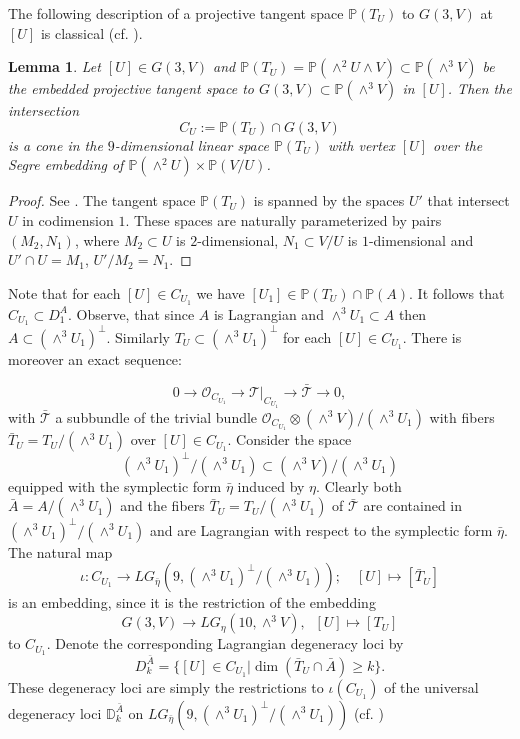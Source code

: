 \documentclass[a4paper,11pt]{amsart}
\newtheorem{lem}[thm]{Lemma}
\theoremstyle{definition}
\numberwithin{equation}{section}
\numberwithin{equation}{section} \theoremstyle{definition}
\begin{document}
The following description of a projective tangent space ${{\mathbb{P}}}(T_U)$ to $G(3,V)$ at $[U]$ is classical (cf. \cite{Donagi}).
\begin{lem}\label{lem-C_U} Let $[U]\in G(3,V)$ and ${{\mathbb{P}}}(T_{U})={{\mathbb{P}}}(\wedge^2{U}\wedge V)\subset {{\mathbb{P}}}(\wedge^3V)$ be the embedded projective tangent space to $G(3,V)\subset {{\mathbb{P}}}(\wedge^3 V)$ in $[U]$.
Then the intersection
$$C_{U}:={{\mathbb{P}}}(T_{U})\cap G(3,V)$$ 
 is a cone in the $9$-dimensional linear space ${{\mathbb{P}}}(T_{U})$ with vertex $[U]$ over the Segre embedding of ${{\mathbb{P}}}(\wedge^2U)\times {{\mathbb{P}}}(V/U)$.
\end{lem}
\begin{proof} See \cite[Lemma 3.5]{Donagi}.  The tangent space ${{\mathbb{P}}}(T_U)$ is spanned by the spaces $U'$ that intersect $U$ in codimension $1$.  These spaces are naturally parameterized by pairs $(M_2,N_1)$, where $M_2\subset U$ is $2$-dimensional, $N_1\subset V/U$ is $1$-dimensional and $U'\cap U=M_1$, $U'/M_2=N_1$.  
\end{proof}
\medskip
Note that for each $[U]\in C_{U_1}$ we have $[U_1]\in \mathbb{P}(T_U)\cap{{\mathbb{P}}}(A)$. It follows that $C_{U_1}\subset D_1^A$.  Observe, that since $A$ is Lagrangian and $\wedge^3 U_1\subset A$
then $A\subset (\wedge^3 U_1)^{\perp}$. Similarly $T_U\subset (\wedge^3 U_1)^{\perp}$ for each $[U]\in C_{U_1}$. There is moreover an exact sequence:

\begin{equation}\label{egbart}\textstyle
0\to \mathcal{O}_{C_{U_1}} \to \mathcal{T} |_{C_{U_1}} \to \bar {\mathcal{T}} \to 0, 
\end{equation}
with $\bar{\mathcal{T}}$ a subbundle of the trivial bundle $\mathcal{O}_{C_{U_1}}\otimes (\wedge^3 V)/(\wedge^3 U_1)$ with fibers $\bar{T}_U= T_U/(\wedge^3 U_1)$ over $[U]\in C_{U_1}$.
Consider the space $$(\wedge^3 U_1)^{\perp}/(\wedge^3 U_1) \subset (\wedge^3 V)/(\wedge^3 U_1)$$ equipped with the symplectic form $\bar{\eta}$ induced by $\eta$. Clearly both $\bar{A}=A/(\wedge^3 U_1)$ and the fibers $\bar{T}_U= T_U/(\wedge^3 U_1)$ of $\bar{\mathcal{T}}$ are contained in $ (\wedge^3 U_1)^{\perp}/(\wedge^3 U_1)$  and are Lagrangian with respect to the symplectic form $\bar{\eta}$.  The natural map
\[
\iota: C_{U_1}\to LG_{\bar{\eta}}(9,(\wedge^3 U_1)^{\perp}/(\wedge^3 U_1));\quad [U]\mapsto [\bar{T}_U]
\]
is an embedding, since it is the restriction of the embedding 
\[
G(3,V)\to LG_\eta(10,\wedge^3V), \;\; [U]\mapsto [T_U]
\]
 to $C_{U_1}$.
Denote the corresponding Lagrangian degeneracy loci by
$$D_k^{\bar{A}}=\{ [U]\in C_{U_1}| \dim (\bar{T}_U \cap \bar{A})\geq k\}.$$
These degeneracy loci are simply the restrictions to $\iota(C_{U_1})$ of the universal degeneracy loci $\mathbb{D}_k^{\bar{A}}$ on $LG_{\bar{\eta}}(9,(\wedge^3 U_1)^{\perp}/(\wedge^3 U_1))$ (cf. \cite{PragaczRatajski})
\end{document}
